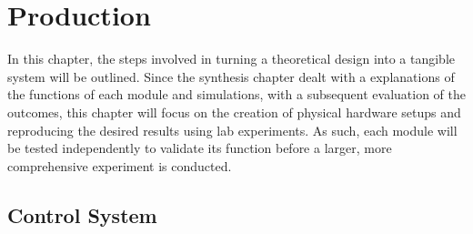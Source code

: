 \chapter{Production}
In this chapter, the steps involved in turning a theoretical design into a tangible system will be outlined. Since the synthesis chapter dealt with a explanations of the functions of each module and simulations, with a subsequent evaluation of the outcomes, this chapter will focus on the creation of physical hardware setups and reproducing the desired results using lab experiments. As such, each module will be tested independently to validate its function before a larger, more comprehensive experiment is conducted.
\section{Control System}

